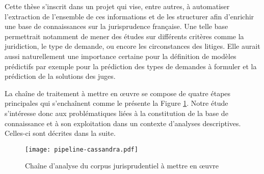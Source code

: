 Cette thèse s'inscrit dans un projet qui vise, entre autres, à automatiser l'extraction de l'ensemble de ces informations et de les structurer afin d'enrichir une base de connaissances sur la jurisprudence française. Une telle base permettrait notamment de mener des études sur différents critères comme la juridiction, le type de demande, ou encore les circonstances des litiges. Elle aurait aussi naturellement une importance certaine pour la définition de modèles prédictifs par exemple pour la prédiction des types de demandes à formuler et la prédiction de la solutions des juges. 


 La chaîne de traitement à mettre en \oe uvre se compose de quatre étapes principales qui s'enchaînent comme le présente la Figure \ref{fig:intro:pipeline-globale}. Notre étude s'intéresse donc aux problématiques liées à la constitution de la base de connaissance et à son exploitation dans un contexte d'analyses descriptives. Celles-ci sont décrites dans la suite.

\begin{figure}[!htb]
	\texttt{[image: pipeline-cassandra.pdf]}
	\caption{Chaîne d'analyse du corpus jurisprudentiel à mettre en \oe uvre} \label{fig:intro:pipeline-globale}
\end{figure} 


